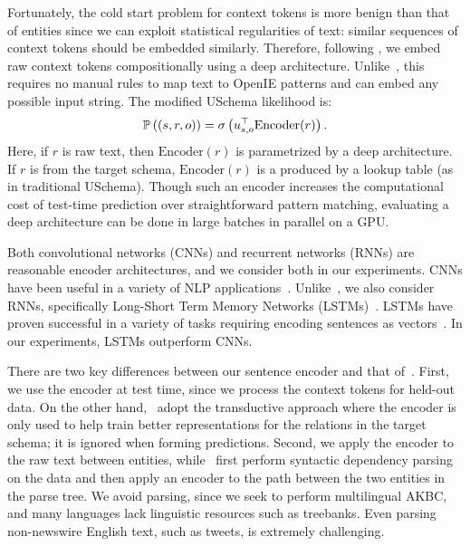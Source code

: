Fortunately, the cold start problem for context tokens is more benign than that of entities since we can exploit statistical regularities of text: similar sequences of context tokens should be embedded similarly. Therefore, following \citet{toutanova2015representing}, we  embed raw context tokens compositionally using a deep architecture. Unlike~\citet{limin}, this requires no manual rules to map text to OpenIE patterns and can embed any possible input string. The modified USchema likelihood is:
\begin{equation}
\mathbb{P} \left((s,r,o)\right) = \sigma\left( u_{s,o}^\top \text{Encoder}(r) \right).
\end{equation}
Here, if $r$ is raw text, then $\text{Encoder}(r)$ is parametrized by a deep architecture. If $r$ is from the target schema, $\text{Encoder}(r)$ is a produced by a lookup table (as in traditional USchema). Though such an encoder increases the computational cost of test-time prediction over straightforward pattern matching, evaluating a deep architecture can be done in large batches in parallel on a GPU.

Both convolutional networks (CNNs) and recurrent networks (RNNs) are reasonable encoder architectures, and we consider both in our experiments. CNNs have been useful in a variety of NLP applications~\citep{collobert2011natural,KalchbrennerACL2014,kim2014convolutional}. Unlike~\citet{toutanova2015representing}, we also consider RNNs, specifically Long-Short Term Memory Networks (LSTMs)~\citep{lstm}. LSTMs have proven successful in a variety of tasks requiring encoding sentences as vectors~\citep{rnnmt,rnnparse}. In our experiments, LSTMs outperform CNNs.

There are two key differences between our sentence encoder and that of~\citet{toutanova2015representing}.  First, we use the encoder at test time, since we process the context tokens for held-out data. On the other hand,~\citet{toutanova2015representing} adopt the transductive approach where the encoder is only used to help train better representations for the relations in the target schema; it is ignored when forming predictions.  Second, we apply the encoder to the raw text between entities, while~\citet{toutanova2015representing} first perform syntactic dependency parsing on the data and then apply an encoder to the path between the two entities in the parse tree. We avoid parsing, since we seek to perform multilingual AKBC, and many languages lack linguistic resources such as treebanks. Even parsing non-newswire English text, such as tweets, is extremely challenging. %

